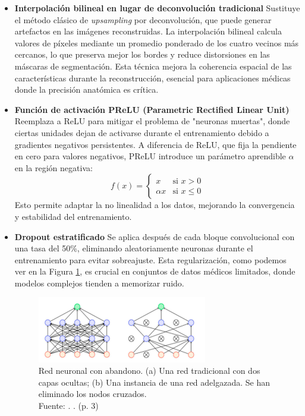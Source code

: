\begin{itemize}
    \item \textbf{Interpolación bilineal en lugar de deconvolución tradicional}
	Sustituye el método clásico de \textit{upsampling} por deconvolución, que puede generar artefactos en las imágenes reconstruidas.
	La interpolación bilineal calcula valores de píxeles mediante un promedio ponderado de los cuatro vecinos más cercanos, lo que preserva mejor los bordes y reduce distorsiones en las máscaras de segmentación.
	Esta técnica mejora la coherencia espacial de las características durante la reconstrucción, esencial para aplicaciones médicas donde la precisión anatómica es crítica.
	

	\item \textbf{Función de activación PReLU (Parametric Rectified Linear Unit)}
	Reemplaza a ReLU para mitigar el problema de "neuronas muertas", donde ciertas unidades dejan de activarse durante el entrenamiento debido a gradientes negativos persistentes.
	A diferencia de ReLU, que fija la pendiente en cero para valores negativos, PReLU introduce un parámetro aprendible $\alpha$ en la región negativa:
	$$
	f(x) =
	\begin{cases}
		x & \text{si } x > 0 \\
		\alpha x & \text{si } x \leq 0
	\end{cases}
	$$
	Esto permite adaptar la no linealidad a los datos, mejorando la convergencia y estabilidad del entrenamiento.

	
	\item \textbf{Dropout estratificado}
	Se aplica después de cada bloque convolucional con una tasa del 50\%, eliminando aleatoriamente neuronas durante el entrenamiento para evitar sobreajuste.
	Esta regularización, como podemos ver en la Figura \ref{2:figdrop}, es crucial en conjuntos de datos médicos limitados, donde modelos complejos tienden a memorizar ruido.
	
	\begin{figure}[H]
		\begin{center}
			\includegraphics[width=0.7\textwidth]{2/figures/tecsart4.png}
			\caption[Red neuronal con abandono. (a) Una red tradicional con dos capas ocultas; (b) Una instancia de una red adelgazada. Se han eliminado los nodos cruzados]{Red neuronal con abandono. (a) Una red tradicional con dos capas ocultas; (b) Una instancia de una red adelgazada. Se han eliminado los nodos cruzados.\\
				Fuente: \cite{karshiev2020improved}. . (p. 3)}
			\label{2:figdrop}
		\end{center}
	\end{figure}
\end{itemize}


